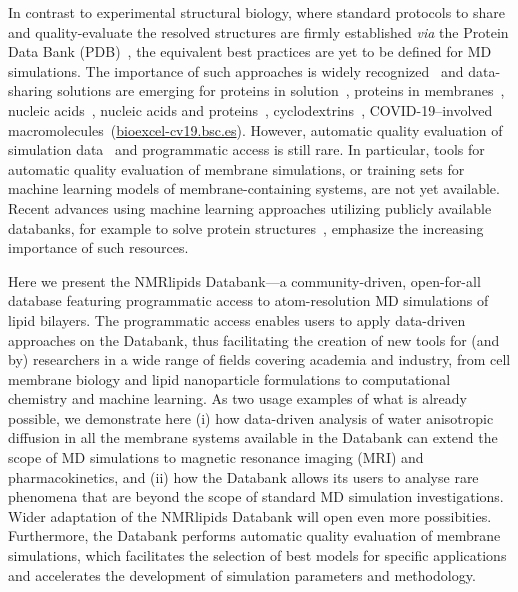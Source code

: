 \documentclass[fleqn,10pt]{wlscirep}
\begin{document}
In contrast to experimental structural biology, where standard protocols to share and quality-evaluate the resolved structures are firmly established \textit{via} the Protein Data Bank (PDB)~\cite{montelione13}, the equivalent best practices are yet to be defined for MD simulations. The importance of such approaches is widely recognized~\cite{feig99,tai04,silva06,abraham19,hildebrand19,hospital20,abriata20,espigares20} and data-sharing solutions are emerging for proteins in solution~\cite{meyer10,kamp10}, proteins in membranes~\cite{newport19,espigares20,leston22}, nucleic acids~\cite{hospital16}, nucleic acids and proteins~\cite{bekker20}, cyclodextrins~\cite{mixcoha16}, COVID-19--involved macromolecules~(\url{bioexcel-cv19.bsc.es}). However, automatic quality evaluation of simulation data~\cite{meyer10,hospital16} and programmatic access is still rare. In particular, tools for automatic quality evaluation of membrane simulations, or training sets for machine learning models of membrane-containing systems, are not yet available. Recent advances using machine learning approaches utilizing publicly available databanks, for example to solve protein structures~\cite{jumper21}, emphasize the increasing importance of such resources. 


Here we present the NMRlipids Databank---a community-driven, open-for-all database featuring programmatic access to atom-resolution MD simulations of lipid bilayers. The programmatic access enables users to apply data-driven approaches on the Databank, thus facilitating the creation of new tools for (and by) researchers in a wide range of fields covering academia and industry, from cell membrane biology and lipid nanoparticle formulations to computational chemistry and machine learning. As two usage examples of what is already possible, we demonstrate here (i) how data-driven analysis of water anisotropic diffusion in all the membrane systems available in the Databank can extend the scope of MD simulations to magnetic resonance imaging (MRI) and pharmacokinetics, and (ii) how the Databank allows its users to analyse rare phenomena that are beyond the scope of standard MD simulation investigations. Wider adaptation of the NMRlipids Databank will open even more possibities. Furthermore, the Databank performs automatic quality evaluation of membrane simulations, which facilitates the selection of best models for specific applications and accelerates the development of simulation parameters and methodology.  
\end{document}
